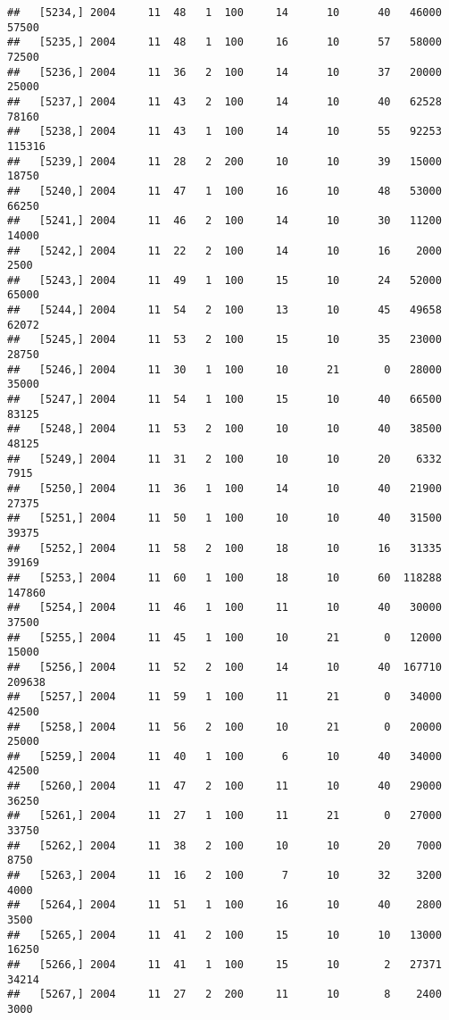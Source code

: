 \documentclass{article}\usepackage[]{graphicx}\usepackage[]{color}
\makeatletter
\newenvironment{kframe}{%
 \def\at@end@of@kframe{}%
 \ifinner\ifhmode%
  \def\at@end@of@kframe{\end{minipage}}%
  \begin{minipage}{\columnwidth}%
 \fi\fi%
 \def\FrameCommand##1{\hskip\@totalleftmargin \hskip-\fboxsep
 \colorbox{shadecolor}{##1}\hskip-\fboxsep
     \hskip-\linewidth \hskip-\@totalleftmargin \hskip\columnwidth}%
 \MakeFramed {\advance\hsize-\width
   \@totalleftmargin\z@ \linewidth\hsize
   \@setminipage}}%
 {\par\unskip\endMakeFramed%
 \at@end@of@kframe}
\newenvironment{knitrout}{}{} %
\makeatother
\begin{document}
\begin{knitrout}
\begin{kframe}
\begin{verbatim}
##   [5234,] 2004     11  48   1  100     14      10      40   46000   57500
##   [5235,] 2004     11  48   1  100     16      10      57   58000   72500
##   [5236,] 2004     11  36   2  100     14      10      37   20000   25000
##   [5237,] 2004     11  43   2  100     14      10      40   62528   78160
##   [5238,] 2004     11  43   1  100     14      10      55   92253  115316
##   [5239,] 2004     11  28   2  200     10      10      39   15000   18750
##   [5240,] 2004     11  47   1  100     16      10      48   53000   66250
##   [5241,] 2004     11  46   2  100     14      10      30   11200   14000
##   [5242,] 2004     11  22   2  100     14      10      16    2000    2500
##   [5243,] 2004     11  49   1  100     15      10      24   52000   65000
##   [5244,] 2004     11  54   2  100     13      10      45   49658   62072
##   [5245,] 2004     11  53   2  100     15      10      35   23000   28750
##   [5246,] 2004     11  30   1  100     10      21       0   28000   35000
##   [5247,] 2004     11  54   1  100     15      10      40   66500   83125
##   [5248,] 2004     11  53   2  100     10      10      40   38500   48125
##   [5249,] 2004     11  31   2  100     10      10      20    6332    7915
##   [5250,] 2004     11  36   1  100     14      10      40   21900   27375
##   [5251,] 2004     11  50   1  100     10      10      40   31500   39375
##   [5252,] 2004     11  58   2  100     18      10      16   31335   39169
##   [5253,] 2004     11  60   1  100     18      10      60  118288  147860
##   [5254,] 2004     11  46   1  100     11      10      40   30000   37500
##   [5255,] 2004     11  45   1  100     10      21       0   12000   15000
##   [5256,] 2004     11  52   2  100     14      10      40  167710  209638
##   [5257,] 2004     11  59   1  100     11      21       0   34000   42500
##   [5258,] 2004     11  56   2  100     10      21       0   20000   25000
##   [5259,] 2004     11  40   1  100      6      10      40   34000   42500
##   [5260,] 2004     11  47   2  100     11      10      40   29000   36250
##   [5261,] 2004     11  27   1  100     11      21       0   27000   33750
##   [5262,] 2004     11  38   2  100     10      10      20    7000    8750
##   [5263,] 2004     11  16   2  100      7      10      32    3200    4000
##   [5264,] 2004     11  51   1  100     16      10      40    2800    3500
##   [5265,] 2004     11  41   2  100     15      10      10   13000   16250
##   [5266,] 2004     11  41   1  100     15      10       2   27371   34214
##   [5267,] 2004     11  27   2  200     11      10       8    2400    3000

\end{verbatim}
\end{kframe}
\end{knitrout}
\end{document}
